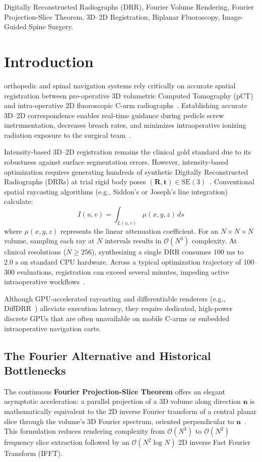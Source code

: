 \documentclass[journal,twocolumn]{IEEEtran}
\begin{document}
\begin{IEEEkeywords}
Digitally Reconstructed Radiographs (DRR), Fourier Volume Rendering, Fourier Projection-Slice Theorem, 3D--2D Registration, Biplanar Fluoroscopy, Image-Guided Spine Surgery.
\end{IEEEkeywords}

\section{Introduction}
 orthopedic and spinal navigation systems rely critically on accurate spatial registration between pre-operative 3D volumetric Computed Tomography (pCT) and intra-operative 2D fluoroscopic C-arm radiographs~\cite{markelj2012review,van2018evaluation}. Establishing accurate 3D--2D correspondence enables real-time guidance during pedicle screw instrumentation, decreases breach rates, and minimizes intraoperative ionizing radiation exposure to the surgical team~\cite{knez2020computer}.

Intensity-based 3D--2D registration remains the clinical gold standard due to its robustness against surface segmentation errors. However, intensity-based optimization requires generating hundreds of synthetic Digitally Reconstructed Radiographs (DRRs) at trial rigid body poses $(\mathbf{R}, \mathbf{t}) \in \mathrm{SE}(3)$~\cite{unberath2021impact}. Conventional spatial raycasting algorithms (e.g., Siddon's or Joseph's line integration) calculate:
\begin{equation}
I(u, v) = \int_{L(u, v)} \mu(x, y, z) \, ds
\end{equation}
where $\mu(x, y, z)$ represents the linear attenuation coefficient. For an $N \times N \times N$ volume, sampling each ray at $N$ intervals results in $\mathcal{O}(N^3)$ complexity. At clinical resolutions ($N \ge 256$), synthesizing a single DRR consumes $100\text{ ms}$ to $2.0\text{ s}$ on standard CPU hardware. Across a typical optimization trajectory of 100--300 evaluations, registration can exceed several minutes, impeding active intraoperative workflows~\cite{gopalakrishnan2022drr}.

Although GPU-accelerated raycasting and differentiable renderers (e.g., DiffDRR~\cite{killeen2023diffdrr}) alleviate execution latency, they require dedicated, high-power discrete GPUs that are often unavailable on mobile C-arms or embedded intraoperative navigation carts.

\subsection{The Fourier Alternative and Historical Bottlenecks}
The continuous \textbf{Fourier Projection-Slice Theorem} offers an elegant asymptotic acceleration: a parallel projection of a 3D volume along direction $\mathbf{n}$ is mathematically equivalent to the 2D inverse Fourier transform of a central planar slice through the volume's 3D Fourier spectrum, oriented perpendicular to $\mathbf{n}$~\cite{malzbender1993fourier}. This formulation reduces rendering complexity from $\mathcal{O}(N^3)$ to $\mathcal{O}(N^2)$ frequency slice extraction followed by an $\mathcal{O}(N^2 \log N)$ 2D inverse Fast Fourier Transform (IFFT).
\end{document}

